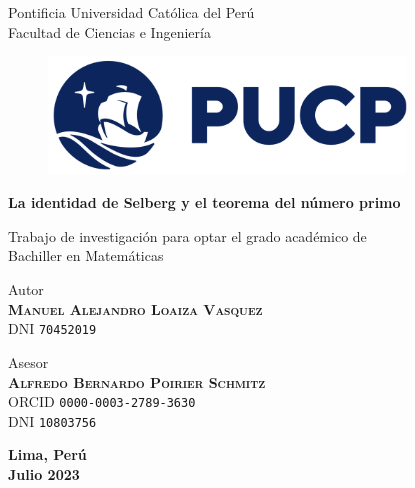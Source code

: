 \thispagestyle{empty}

\bigskip

\begin{center}
  {\baselineskip=30pt \Large Pontificia Universidad Cat\'olica del Per\'u} \\
  {\baselineskip=30pt \large Facultad de Ciencias e Ingenier\'ia}
\end{center}

\bigskip

\begin{figure}[H]
  \begin{center}
    \includegraphics[width=9.5cm]{images/2021-pucp-logo.png}
  \end{center}
\end{figure}

\begin{center}
  \begin{minipage}{14.0cm}
    \begin{center}
      \textcolor{pucp}
      {\textbf{\Huge{La identidad de Selberg y el teorema del n\'umero primo}}}
    \end{center}
  \end{minipage}
\end{center}

\vspace*{2.00cm}

\begin{center}
  Trabajo de investigaci\'on para optar el grado acad\'emico de \\
  Bachiller en Matem\'aticas
\end{center}

\vspace*{2.00cm}

\begin{center}
  Autor \\
  \textbf{\textsc{Manuel Alejandro Loaiza Vasquez}} \\
  DNI \texttt{70452019}
\end{center}

\vspace*{0.5cm}

\begin{center}
  Asesor \\
  \textbf{\textsc{Alfredo Bernardo Poirier Schmitz}} \\
  ORCID \texttt{0000-0003-2789-3630} \\
  DNI \texttt{10803756}
\end{center}

\vspace*{1.00cm}

\begin{center}
  {
    \baselineskip=10pt
    \textbf{Lima, Per\'u} \\
    \textbf{Julio 2023}
  }
\end{center}

